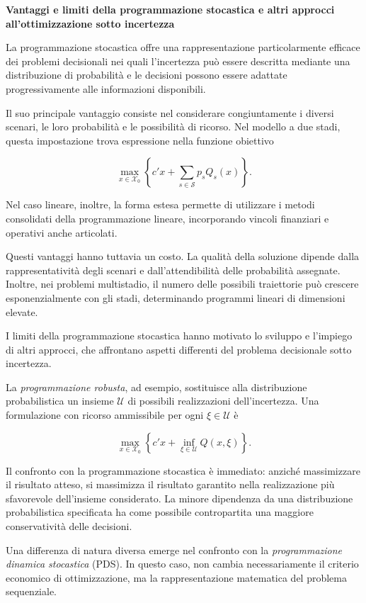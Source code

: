 \medskip
\noindent
\textbf{Vantaggi e limiti della programmazione stocastica
e altri approcci all'ottimizzazione sotto incertezza}

La programmazione stocastica offre una rappresentazione
particolarmente efficace dei problemi decisionali nei quali
l'incertezza pu\`{o} essere descritta mediante una distribuzione
di probabilit\`{a} e le decisioni possono essere adattate
progressivamente alle informazioni disponibili.

Il suo principale vantaggio consiste nel considerare
congiuntamente i diversi scenari, le loro probabilit\`{a}
e le possibilit\`{a} di ricorso. Nel modello a due stadi,
questa impostazione trova espressione nella funzione
obiettivo

\[
\max_{x\in\mathcal X_0}
\left\{
c'x+\sum_{s\in\mathcal S}p_sQ_s(x)
\right\}.
\]

Nel caso lineare, inoltre, la forma estesa permette
di utilizzare i metodi consolidati della programmazione
lineare, incorporando vincoli finanziari e operativi
anche articolati.

Questi vantaggi hanno tuttavia un costo.
La qualit\`{a} della soluzione dipende dalla
rappresentativit\`{a} degli scenari e dall'attendibilit\`{a}
delle probabilit\`{a} assegnate. Inoltre, nei problemi
multistadio, il numero delle possibili traiettorie
pu\`{o} crescere esponenzialmente con gli stadi,
determinando programmi lineari di dimensioni elevate.

I limiti della programmazione stocastica hanno
motivato lo sviluppo e l'impiego di altri approcci,
che affrontano aspetti differenti del problema
decisionale sotto incertezza.

La \emph{programmazione robusta}, ad esempio,
sostituisce alla distribuzione probabilistica
un insieme $\mathcal U$ di possibili realizzazioni
dell'incertezza. Una formulazione con ricorso
ammissibile per ogni $\xi\in\mathcal U$ \`{e}

\[
\max_{x\in\mathcal X_0}
\left\{
c'x+
\inf_{\xi\in\mathcal U}Q(x,\xi)
\right\}.
\]

Il confronto con la programmazione stocastica
\`{e} immediato: anzich\'{e} massimizzare
il risultato atteso, si massimizza
il risultato garantito nella realizzazione
pi\`{u} sfavorevole dell'insieme considerato.
La minore dipendenza da una distribuzione
probabilistica specificata ha come possibile
contropartita una maggiore conservativit\`{a}
delle decisioni.

Una differenza di natura diversa emerge
nel confronto con la \emph{programmazione
dinamica stocastica} (PDS). In questo caso,
non cambia necessariamente il criterio
economico di ottimizzazione, ma la
rappresentazione matematica del problema
sequenziale.

